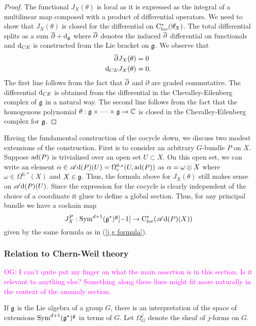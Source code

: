 \documentclass[10pt]{amsart}
\def\sAd{\sA{\rm d}}
\def\owen{\textcolor{magenta}{OG: }\textcolor{magenta}}
\begin{document}
\begin{proof} 
The functional $J_X(\theta)$ is local as it is expressed as the integral of a multilinear map composed with a product of differential operators.
We need to show that $J_X(\theta)$ is closed for the differential on ${\rm C}_{\rm loc}^*(\mathscr G_X)$. 
The total differential splits as a sum $\overline{\partial} + {\rm d}_{\mathfrak g}$ where $\overline{\partial}$ denotes the induced $\overline{\partial}$ differential on functionals and ${\rm d}_{CE}$ is constructed from the Lie bracket on $\mathfrak g$. 
We observe that
\begin{align*}
\overline{\partial} J_X(\theta) & = 0 \\
{\rm d}_{CE} J_X(\theta) & = 0 .
\end{align*}
The first line follows from the fact that $\overline{\partial}$ and $\partial$ are graded commutative. 
The differential ${\rm d}_{CE}$ is obtained from the differential in the Chevalley-Eilenberg complex of $\mathfrak g$ in a natural way. 
The second line follows from the fact that the homogenous polynomial $\theta : \mathfrak g \times \cdots \times \mathfrak g \to \mathbb C$ is closed in the Chevalley-Eilenberg complex for $\mathfrak g$.
\end{proof}

Having the fundamental construction of the cocycle down, we discuss two modest extensions of the construction. 
First is to consider an arbitrary $G$-bundle $P$ on $X$. 
Suppose ${\rm ad}(P)$ is trivialized over an open set $U \subset X$.
On this open set, we can write an element $\alpha \in \sAd(P) (U) = \Omega^{0,*}_c(U, \ad(P))$ as 
$\alpha = \omega \otimes X$ where $\omega \in \Omega^{0,*}(X)$ and $X \in \mathfrak g$. 
Thus, the formula above for $J_X(\theta)$ still makes sense on $\sAd(P)(U)$. 
Since the expression for the cocycle is clearly independent of the choice of a coordinate it glues to define a global section. 
Thus, for any principal bundle we have a cochain map
\[
J_X^P : \Sym^{d+1} (\fg^*)^\fg [-1] \to \cloc^*(\sAd(P)(X))
\]
given by the same formula as in (\ref{j g formula}).

\subsubsection{Relation to Chern-Weil theory}

\owen{I can't quite put my finger on what the main assertion is in this section. Is it relevant to anything else? Something along these lines might fit more naturally in the context of the anomaly section.}

If $\mathfrak g$ is the Lie algebra of a group $G$, there is an interpretation of the space of extensions ${\rm Sym}^{d+1}(\mathfrak g^*)^\mathfrak g$ in terms of $G$.
Let $\Omega^j_G$ denote the sheaf of $j$-forms on $G$. 
\end{document}
